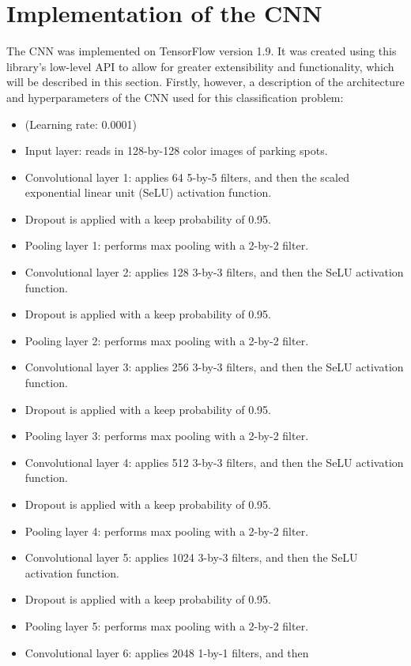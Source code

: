 \documentclass[a4paper, 11pt]{article} %
\begin{document}
\section{Implementation of the CNN}
	The CNN was implemented on TensorFlow version 1.9. It was created using 
	this library's low-level API to
	allow for greater extensibility and functionality, which will be described in this section. Firstly, however,
	a description of the architecture and hyperparameters of the CNN used for this classification problem:
	\begin{itemize}
		\setlength\itemsep{-3mm}
		\item[] (Learning rate: 0.0001)
		\item[] Input layer: reads in 128-by-128 color images of parking spots.
		\item[] Convolutional layer 1: applies 64 5-by-5 filters, and then the 
		scaled exponential linear unit (SeLU) activation function.
		\item[] Dropout is applied with a keep probability of 0.95.
		\item[] Pooling layer 1: performs max pooling with a 2-by-2 filter.
		\item[] Convolutional layer 2: applies 128 3-by-3 filters, and then the 
		SeLU activation function.
		\item[] Dropout is applied with a keep probability of 0.95.
		\item[] Pooling layer 2: performs max pooling with a 2-by-2 filter.
		\item[] Convolutional layer 3: applies 256 3-by-3 filters, and then the 
		SeLU activation function.
		\item[] Dropout is applied with a keep probability of 0.95.
		\item[] Pooling layer 3: performs max pooling with a 2-by-2 filter.
		\item[] Convolutional layer 4: applies 512 3-by-3 filters, and then the 
		SeLU activation function.
		\item[] Dropout is applied with a keep probability of 0.95.
		\item[] Pooling layer 4: performs max pooling with a 2-by-2 filter.
		\item[] Convolutional layer 5: applies 1024 3-by-3 filters, and then 
		the SeLU activation function.
		\item[] Dropout is applied with a keep probability of 0.95.
		\item[] Pooling layer 5: performs max pooling with a 2-by-2 filter.
		\item[] Convolutional layer 6: applies 2048 1-by-1 filters, and then 

\end{itemize}
\end{document}
